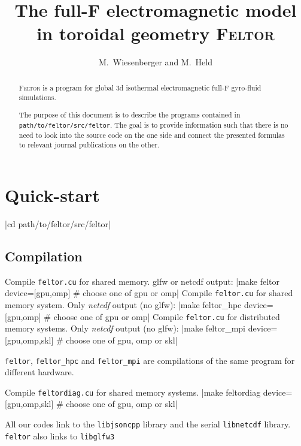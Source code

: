 


\usepackage{minted}



\title{
The full-F electromagnetic model in toroidal geometry \textsc{Feltor}}
\author{ M.~Wiesenberger and M.~Held}
\maketitle

\begin{abstract}
\textsc{Feltor} is a program for global 3d isothermal electromagnetic full-F gyro-fluid simulations.

The purpose of this document is to describe the programs
contained in \texttt{path/to/feltor/src/feltor}.
 The goal is to provide
information such that there is no need to look
into the source code on the one side and connect
the presented formulas to relevant journal publications on the other.
\end{abstract}
\tableofcontents

\section{Quick-start}

|cd path/to/feltor/src/feltor|
\subsection{Compilation}
Compile \texttt{feltor.cu} for shared memory. glfw or netcdf output:
|make feltor device=[gpu,omp] # choose one of gpu or omp|
\noindent Compile \texttt{feltor.cu} for shared memory system. Only {\it netcdf} output (no glfw):
|make feltor_hpc device=[gpu,omp] # choose one of gpu or omp|
\noindent Compile \texttt{feltor.cu} for distributed memory systems. Only {\it netcdf} output (no glfw):
|make feltor_mpi device=[gpu,omp,skl] # choose one of gpu, omp or skl|
\begin{tcolorbox}[title=Note]
    \texttt{feltor}, \texttt{feltor_hpc} and \texttt{feltor_mpi} are
    compilations of the same program for different hardware.
\end{tcolorbox}
\noindent Compile \texttt{feltordiag.cu} for shared memory systems.
|make feltordiag device=[gpu,omp,skl] # choose one of gpu, omp or skl|
\begin{tcolorbox}[title=Note]
    All our codes link to the \texttt{libjsoncpp} library and the serial \texttt{libnetcdf} library. \texttt{feltor} also links to \texttt{libglfw3}
\end{tcolorbox}
